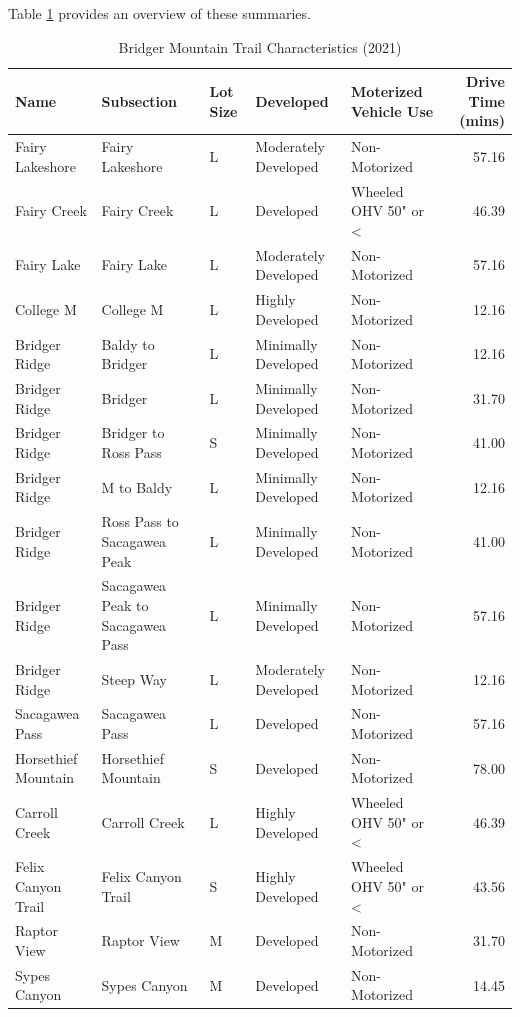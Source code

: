 \documentclass[
]{book}
\begin{document}
Table \ref{tab:table-char} provides an overview of these summaries.

\begin{landscape}\begin{table}

\caption{\label{tab:table-char}Bridger Mountain Trail Characteristics (2021)}
\centering
\begin{tabular}[t]{lllllr}
\toprule
Name & Subsection & Lot Size & Developed & Moterized Vehicle Use & Drive Time (mins)\\
\midrule
Fairy Lakeshore & Fairy Lakeshore & L & Moderately Developed & Non-Motorized & 57.16\\
Fairy Creek & Fairy Creek & L & Developed & Wheeled OHV 50" or < & 46.39\\
Fairy Lake & Fairy Lake & L & Moderately Developed & Non-Motorized & 57.16\\
College M & College M & L & Highly Developed & Non-Motorized & 12.16\\
Bridger Ridge & Baldy to Bridger & L & Minimally Developed & Non-Motorized & 12.16\\
\addlinespace
Bridger Ridge & Bridger & L & Minimally Developed & Non-Motorized & 31.70\\
Bridger Ridge & Bridger to Ross Pass & S & Minimally Developed & Non-Motorized & 41.00\\
Bridger Ridge & M to Baldy & L & Minimally Developed & Non-Motorized & 12.16\\
Bridger Ridge & Ross Pass to Sacagawea Peak & L & Minimally Developed & Non-Motorized & 41.00\\
Bridger Ridge & Sacagawea Peak to Sacagawea Pass & L & Minimally Developed & Non-Motorized & 57.16\\
\addlinespace
Bridger Ridge & Steep Way & L & Moderately Developed & Non-Motorized & 12.16\\
Sacagawea Pass & Sacagawea Pass & L & Developed & Non-Motorized & 57.16\\
Horsethief Mountain & Horsethief Mountain & S & Developed & Non-Motorized & 78.00\\
Carroll Creek & Carroll Creek & L & Highly Developed & Wheeled OHV 50" or < & 46.39\\
Felix Canyon Trail & Felix Canyon Trail & S & Highly Developed & Wheeled OHV 50" or < & 43.56\\
\addlinespace
Raptor View & Raptor View & M & Developed & Non-Motorized & 31.70\\
Sypes Canyon & Sypes Canyon & M & Developed & Non-Motorized & 14.45\\

\end{tabular}
\end{table}
\end{landscape}
\end{document}
